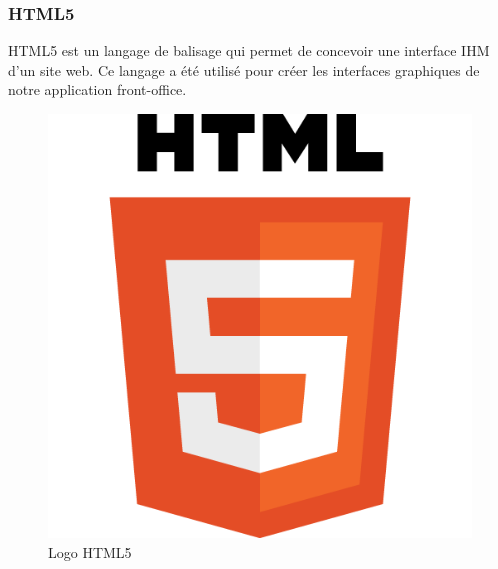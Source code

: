\subsubsection{HTML5}
\noindent\begin{minipage}{0.69\textwidth}
HTML5 est un langage de balisage qui permet de concevoir une interface IHM \footnotemark d'un site web. Ce langage a été utilisé pour créer les interfaces graphiques de notre application front-office.
\end{minipage}
\begin{minipage}{0.3\textwidth}
\begin{figure}[H]
  \centering
  \includegraphics[scale=0.13]{figures/logo/html.png}
  \caption{Logo HTML5}
  \label{code45}
\end{figure}
\end{minipage}
